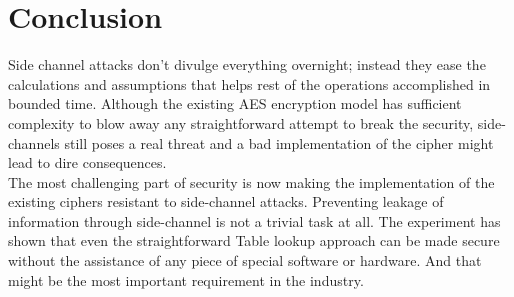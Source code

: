 \section{Conclusion}

Side channel attacks don't divulge everything overnight; instead they ease the calculations and assumptions that helps rest of the operations accomplished in bounded time. Although the existing AES encryption model has sufficient complexity to blow away any straightforward attempt to break the security, side-channels still poses a real threat and a bad implementation of the cipher might lead to dire consequences.\\

The most challenging part of security is now making the implementation of the existing ciphers resistant to side-channel attacks. Preventing leakage of information through side-channel is not a trivial task at all. The experiment has shown that even the straightforward Table lookup approach can be made secure without the assistance of any piece of special software or hardware. And that might be the most important requirement in the industry.
